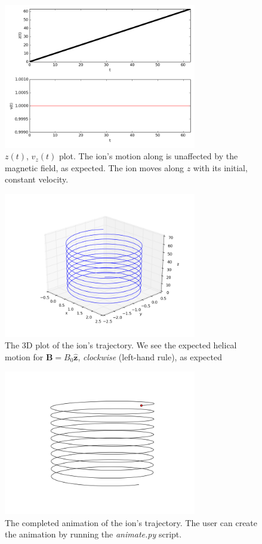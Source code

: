 \documentclass[11pt]{report}
\begin{document}
\begin{figure}[!ht]
  \centering
    \includegraphics[width=0.75\textwidth]{images/gyro_ion_z}
     \caption{$z(t)$, $v_z(t)$ plot. The ion's motion along  is unaffected by the magnetic field, as expected. The ion moves along $z$ with its initial, constant velocity.}
\end{figure}

\begin{figure}[!ht]
  \centering
    \includegraphics[width=0.75\textwidth]{images/gyro_ion_3d}
     \caption{The 3D plot of the ion's trajectory. We see the expected helical motion for $\bm{B} = B_0\hat{\bm{z}}$, \emph{clockwise} (left-hand rule), as expected}
\end{figure}

\begin{figure}[!ht]
  \centering
    \includegraphics[width=0.75\textwidth]{images/gyro_ion_3d_anim}
     \caption{The completed animation of the ion's trajectory. The user can create the animation by running the \emph{animate.py} script.}
\end{figure}
\end{document}
